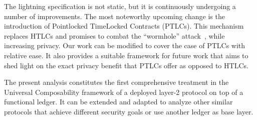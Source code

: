   The lightning specification is not static, but it is continuously
  undergoing a number of improvements. The most noteworthy upcoming change is
  the introduction of Pointlocked TimeLocked Contracts (PTLCs). This mechanism
  replaces HTLCs and promises to combat the ``wormhole''
  attack~\cite{DBLP:conf/ndss/MalavoltaMSKM19}, while increasing privacy. Our
  work can be modified to cover the case of PTLCs with relative ease. It also
  provides a suitable framework for future work that aims to shed light on the
  exact privacy benefit that PTLCs offer as opposed to HTLCs.

  The present analysis constitutes the first comprehensive treatment in
  the Universal Composability framework of a deployed layer-2 protocol on top of
  a functional ledger. It can be extended and adapted to analyze other similar
  protocols that achieve different security goals or use another ledger as base
  layer.

